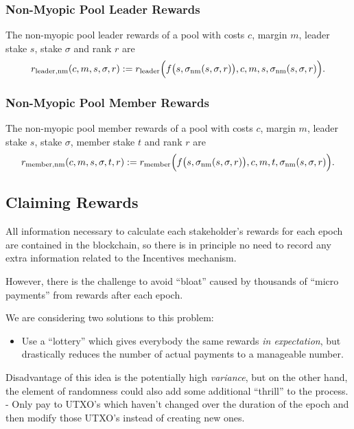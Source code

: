 \documentclass[11pt,a4paper]{article}
\begin{document}
\subsubsection{Non-Myopic Pool Leader Rewards}
\label{non-myopic-pool-leader-rewards}

The non-myopic pool leader rewards of a pool with costs \(c\), margin
\(m\), leader stake \(s\), stake \(\sigma\) and rank \(r\) are \[
    r_\mathrm{leader, nm}(c, m, s, \sigma, r) :=
    r_\mathrm{leader}\Bigl(f\bigl(s,\sigma_\mathrm{nm}(s,\sigma, r)\bigr), c, m, s, \sigma_\mathrm{nm}(s,\sigma,r)\Bigr).
\]

\subsubsection{Non-Myopic Pool Member Rewards}
\label{non-myopic-pool-member-rewards}

The non-myopic pool member rewards of a pool with costs \(c\), margin
\(m\), leader stake \(s\), stake \(\sigma\), member stake \(t\) and rank
\(r\) are \[
    r_\mathrm{member, nm}(c, m, s, \sigma, t, r) :=
    r_\mathrm{member}\Bigl(f\bigl(s,\sigma_\mathrm{nm}(s,\sigma, r)\bigr), c, m, t, \sigma_\mathrm{nm}(s,\sigma,r)\Bigr).
\]

\subsection{Claiming Rewards}
\label{claiming-rewards}

All information necessary to calculate each stakeholder's rewards for
each epoch are contained in the blockchain, so there is in principle no
need to record any extra information related to the Incentives
mechanism.

However, there is the challenge to avoid ``bloat'' caused by thousands
of ``micro payments'' from rewards after each epoch.

We are considering two solutions to this problem:

\begin{itemize}
\item
  Use a ``lottery'' which gives everybody the same rewards \emph{in
  expectation}, but drastically reduces the number of actual payments to
  a manageable number.
\end{itemize}

Disadvantage of this idea is the potentially high \emph{variance}, but
on the other hand, the element of randomness could also add some
additional ``thrill'' to the process. - Only pay to UTXO's which haven't
changed over the duration of the epoch and then modify those UTXO's
instead of creating new ones.
\end{document}
